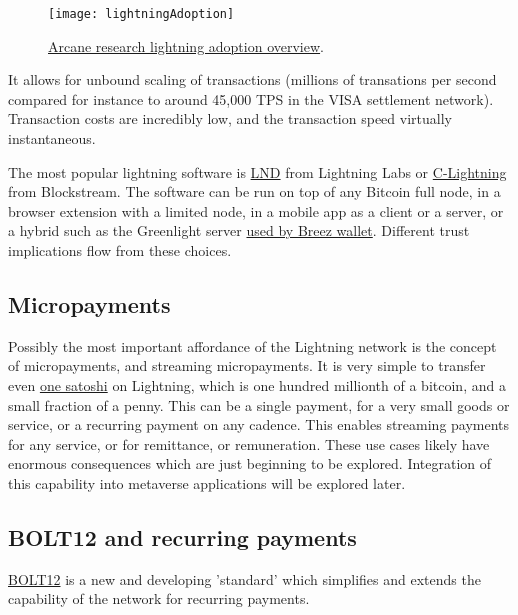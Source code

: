 \begin{figure}
  \centering
    \texttt{[image: lightningAdoption]}
  \caption{\href{https://www.research.arcane.no/the-state-of-lightning}{Arcane research lightning adoption overview}.}
  \label{fig:lightningAdoption}
\end{figure}
It allows for unbound scaling of transactions (millions of transations per second compared for instance to around 45,000 TPS in the VISA settlement network). Transaction costs are incredibly low, and the transaction speed virtually instantaneous.\par
The most popular lightning software is \href{https://github.com/lightningnetwork/lnd#readme}{LND} from Lightning Labs or \href{https://github.com/ElementsProject/lightning}{C-Lightning} from Blockstream. The software can be run on top of any Bitcoin full node, in a browser extension with a limited node, in a mobile app as a client or a server, or a hybrid such as the Greenlight server \href{https://medium.com/breez-technology/get-ready-for-a-fresh-breez-multiple-apps-one-node-optimal-ux-519c4daf2536}{used by Breez wallet}. Different trust implications flow from these choices.
\subsection{Micropayments}
Possibly the most important affordance of the Lightning network is the concept of micropayments, and streaming micropayments. It is very simple to transfer even \href{https://satsymbol.com/}{one satoshi} on Lightning, which is one hundred millionth of a bitcoin, and a small fraction of a penny. This can be a single payment, for a very small goods or service, or a recurring payment on any cadence. This enables streaming payments for any service, or for remittance, or remuneration. These use cases likely have enormous consequences which are just beginning to be explored. Integration of this capability into metaverse applications will be explored later.
\subsection{BOLT12 and recurring payments}
\href{https://bolt12.org/}{BOLT12} is a new and developing 'standard' which simplifies and extends the capability of the network for recurring payments.

